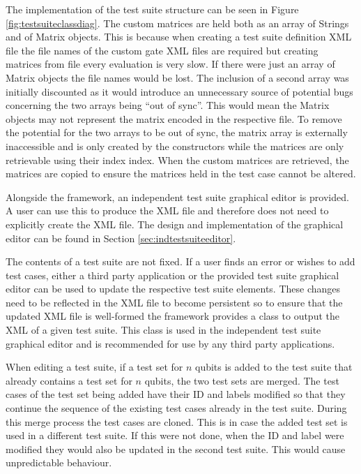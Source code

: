 The implementation of the test suite structure can be seen in Figure \ref{fig:testsuiteclassdiag}.
The custom matrices are held both as an array of Strings and of Matrix objects.
This is because when creating a test suite definition XML file the file names of the custom gate XML files are required but creating matrices from file every evaluation is very slow.
If there were just an array of Matrix objects the file names would be lost.
The inclusion of a second array was initially discounted as it would introduce an unnecessary source of potential bugs concerning the two arrays being ``out of sync''.
This would mean the Matrix objects may not represent the matrix encoded in the respective file.
To remove the potential for the two arrays to be out of sync, the matrix array is externally inaccessible and is only created by the constructors while the matrices are only retrievable using their index index.
When the custom matrices are retrieved, the matrices are copied to ensure the matrices held in the test case cannot be altered.

Alongside the framework, an independent test suite graphical editor is provided.
A user can use this to produce the XML file and therefore does not need to explicitly create the XML file.
The design and implementation of the graphical editor can be found in Section \ref{sec:indtestsuiteeditor}.

The contents of a test suite are not fixed.
If a user finds an error or wishes to add test cases, either a third party application or the provided test suite graphical editor can be used to update the respective test suite elements.
These changes need to be reflected in the XML file to become persistent so to ensure that the updated XML file is well-formed the framework provides a class to output the XML of a given test suite.
This class is used in the independent test suite graphical editor and is recommended for use by any third party applications.

When editing a test suite, if a test set for $n$ qubits is added to the test suite that already contains a test set for $n$ qubits, the two test sets are merged.
The test cases of the test set being added have their ID and labels modified so that they continue the sequence of the existing test cases already in the test suite.
During this merge process the test cases are cloned.
This is in case the added test set is used in a different test suite.
If this were not done, when the ID and label were modified they would also be updated in the second test suite.
This would cause unpredictable behaviour.

